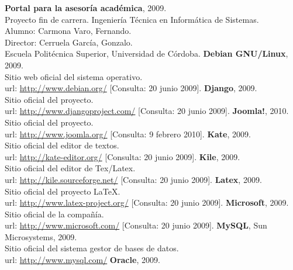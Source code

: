\begin{thebibliography}{xx}

 \textbf{Portal para la asesoría académica}, 2009.\\
         Proyecto fin de carrera. Ingeniería Técnica en Informática de Sistemas.\\
         Alumno: Carmona Varo, Fernando.\\
         Director: Cerruela García, Gonzalo.\\
         Escuela Politécnica Superior, Universidad de Córdoba.
 \textbf{Debian GNU/Linux}, 2009.\\
         Sitio web oficial del sistema operativo.\\
         url: \url{http://www.debian.org/}
         [Consulta: 20 junio 2009].
 \textbf{Django}, 2009.\\
         Sitio oficial del proyecto.\\
         url: \url{http://www.djangoproject.com/}
         [Consulta: 20 junio 2009].
 \textbf{Joomla!}, 2010.\\
         Sitio oficial del proyecto.\\
         url: \url{http://www.joomla.org/}
         [Consulta: 9 febrero 2010].
 \textbf{Kate}, 2009.\\
         Sitio oficial del editor de textos.\\
         url: \url{http://kate-editor.org/}
         [Consulta: 20 junio 2009].
 \textbf{Kile}, 2009.\\
         Sitio oficial del editor de Tex/Latex.\\
         url: \url{http://kile.sourceforge.net/}
         [Consulta: 20 junio 2009].
 \textbf{Latex}, 2009.\\
         Sitio oficial del proyecto \LaTeX.\\
         url: \url{http://www.latex-project.org/}
         [Consulta: 20 junio 2009].
 \textbf{Microsoft}, 2009.\\
         Sitio oficial de la compañía.\\
         url: \url{http://www.microsoft.com/}
         [Consulta: 20 junio 2009].
 \textbf{MySQL}, Sun Microsystems, 2009.\\
         Sitio oficial del sistema gestor de bases de datos.\\
         url: \url{http://www.mysql.com/}
 \textbf{Oracle}, 2009.\\

\end{thebibliography}
